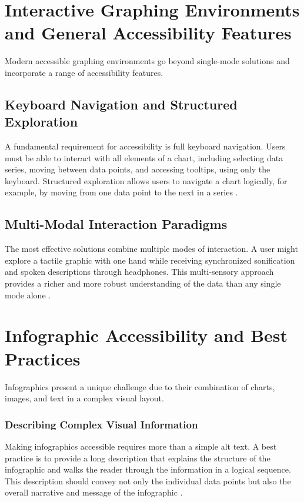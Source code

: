 \section{Interactive Graphing Environments and General Accessibility Features}\label{ch13:sec:interactive-environments}
Modern accessible graphing environments go beyond single-mode solutions and incorporate a range of accessibility features.

\subsection{Keyboard Navigation and Structured Exploration}\label{ch13:ssec:keyboard-navigation}
A fundamental requirement for accessibility is full keyboard navigation. Users must be able to interact with all elements of a chart, including selecting data series, moving between data points, and accessing tooltips, using only the keyboard. Structured exploration allows users to navigate a chart logically, for example, by moving from one data point to the next in a series \supercite{AutoVizuA11y}.

\subsection{Multi-Modal Interaction Paradigms}\label{ch13:ssec:multi-modal}
The most effective solutions combine multiple modes of interaction. A user might explore a tactile graphic with one hand while receiving synchronized sonification and spoken descriptions through headphones. This multi-sensory approach provides a richer and more robust understanding of the data than any single mode alone \supercite{RichScreenReaderExperiences, ReindersAccessibleData}.

\section{Infographic Accessibility and Best Practices}\label{ch13:sec:infographics}
Infographics present a unique challenge due to their combination of charts, images, and text in a complex visual layout.

\subsubsection{Describing Complex Visual Information}\label{ch13:sssec:describing-infographics}
Making infographics accessible requires more than a simple alt text. A best practice is to provide a long description that explains the structure of the infographic and walks the reader through the information in a logical sequence. This description should convey not only the individual data points but also the overall narrative and message of the infographic \supercite{CreatingAccessibleInfographics, AdaptingInfographics}.

